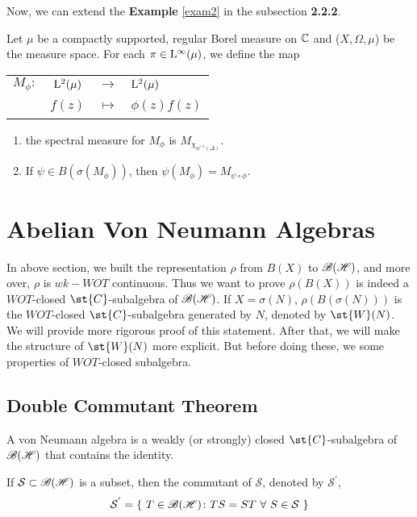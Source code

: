 Now, we can extend the \textbf{Example} \ref{exam2} in the subsection \textbf{2.2.2}.

\begin{exam} \label{exam3}
	Let $\mu$ be a compactly supported, regular Borel measure on $\mathbb{C}$ and ($X,\Omega,\mu$) be the measure space. For each $\pi \in \mathrm{L^{\infty}}(\mu)$, we define the map
	\begin{center}
		\begin{tabular}{l c c l}
			$M_{\phi} \colon$ & $\mathrm{L^{2}}(\mu)$ & $\longrightarrow$ & $\mathrm{L^{2}}(\mu)$ \\
			~ & $f(z)$ & $\longmapsto$ & $\phi(z)f(z)$
		\end{tabular} 
	\end{center}
	\begin{enumerate}[label=\arabic*)]
		\item the spectral measure for $M_{\phi}$ is $M_{\chi_{\phi^{-1}(\Delta)}}$.
		\item If $\psi \in B(\sigma(M_{\phi}))$, then $\psi(M_{\phi}) = M_{\psi \circ \phi}$.
	\end{enumerate}
\end{exam}

\section{Abelian Von Neumann Algebras}

In above section, we built the representation $\rho$ from $B(X)$ to $\mathscr{B(H)}$, and more over, $\rho$ is $wk-WOT$ continuous. Thus we want to prove $\rho(B(X))$ is indeed a $WOT$-closed $\st{C}$-subalgebra of $\mathscr{B(H)}$. If $X = \sigma(N)$, $\rho(B(\sigma(N)))$ is the $WOT$-closed $\st{C}$-subalgebra generated by $N$, denoted by $\st{W}(N)$. We will provide more rigorous proof of this statement. After that, we will make the structure of $\st{W}(N)$ more explicit. But before doing these, we some properties of $WOT$-closed subalgebra.

\subsection{Double Commutant Theorem}

\begin{defn}
	A von Neumann algebra is a weakly (or strongly) closed $\st{C}$-subalgebra of $\mathscr{B(H)}$ that contains the identity.
\end{defn}

\begin{defn}
	If $\mathcal{S} \subset \mathscr{B(H)}$ is a subset, then the commutant of $\mathcal{S}$, denoted by $\mathcal{S}^{'}$,
	\begin{equation*}
		\mathcal{S}^{'} = \{~ T\in \mathscr{B(H)} \colon TS=ST~\forall~S \in \mathcal{S} ~\}
	\end{equation*}
\end{defn}

